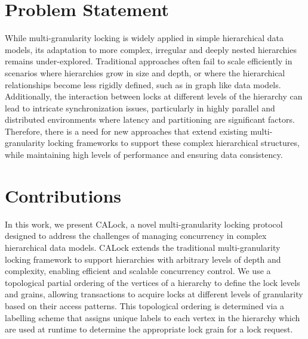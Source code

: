 

\section{Problem Statement}
While multi-granularity locking is widely applied in simple hierarchical data models, its adaptation to more complex, irregular and deeply nested hierarchies remains under-explored. 
Traditional approaches often fail to scale efficiently in scenarios where hierarchies grow in size and depth, or where the hierarchical relationships become less rigidly defined, such as in graph like data models. 
Additionally, the interaction between locks at different levels of the hierarchy can lead to intricate synchronization issues, particularly in highly parallel and distributed environments where latency and partitioning are significant factors.
Therefore, there is a need for new approaches that extend existing multi-granularity locking frameworks to support these complex hierarchical structures, while maintaining high levels of performance and ensuring data consistency.


\section{Contributions}
In this work, we present CALock, a novel multi-granularity locking protocol designed to address the challenges of managing concurrency in complex hierarchical data models.
CALock extends the traditional multi-granularity locking framework to support hierarchies with arbitrary levels of depth and complexity, enabling efficient and scalable concurrency control.
We use a topological partial ordering of the vertices of a hierarchy to define the lock levels and grains, allowing transactions to acquire locks at different levels of granularity based on their access patterns. 
This topological ordering is determined via a labelling scheme that assigns unique labels to each vertex in the hierarchy which are used at runtime to determine the appropriate lock grain for a lock request. 


